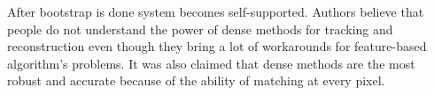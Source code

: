 \documentclass[../../../../main]{subfiles}
\begin{document}
After bootstrap is done system becomes self-supported. Authors believe that people do not understand the power of dense methods for tracking and reconstruction even though they bring a lot of workarounds for feature-based algorithm's problems. It was also claimed that dense methods are the most robust and accurate because of the ability of matching at every pixel.
\end{document}
